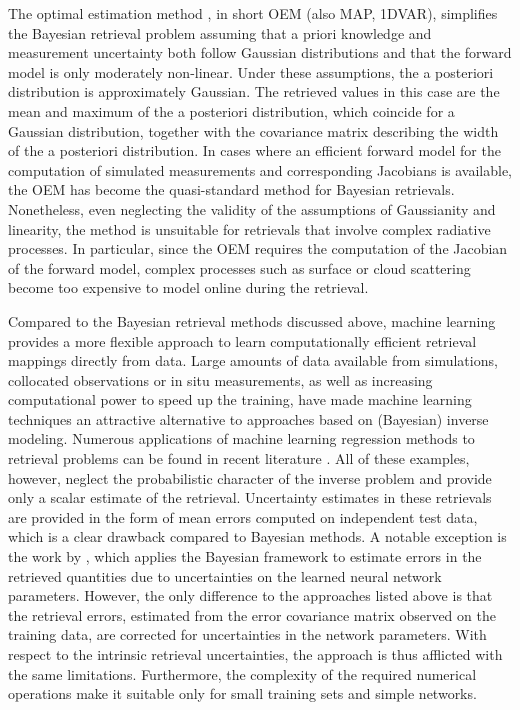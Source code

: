 \documentclass[journal abbreviation, manuscript]{copernicus}
\begin{document}
The optimal estimation method \citep{rodgers}, in short OEM (also MAP, 1DVAR),
simplifies the Bayesian retrieval problem assuming that a priori knowledge and
measurement uncertainty both follow Gaussian distributions and that the forward
model is only moderately non-linear. Under these assumptions, the a posteriori
distribution is approximately Gaussian. The retrieved values in this case are the mean
and maximum of the a posteriori distribution, which coincide for a Gaussian
distribution, together with the covariance matrix describing the width of the a
posteriori distribution. In cases where an efficient forward model for the
computation of simulated measurements and corresponding Jacobians is available,
the OEM has become the quasi-standard method for Bayesian retrievals.
Nonetheless, even neglecting the validity of the assumptions of Gaussianity and
linearity, the method is unsuitable for retrievals that involve complex
radiative processes. In particular, since the OEM requires the computation of the
Jacobian of the forward model, complex processes such as surface or cloud scattering
 become too expensive to model online during the retrieval.

Compared to the Bayesian retrieval methods discussed above, machine learning
provides a more flexible approach to learn computationally efficient retrieval
mappings directly from data. Large amounts of data available from simulations,
collocated observations or in situ measurements, as well as increasing computational
power to speed up the training, have made machine learning techniques
an attractive alternative to approaches based on (Bayesian) inverse modeling.
Numerous applications of machine learning regression methods to retrieval
problems can be found in recent literature \citep{jimenez, holl, strandgren, wang, hakansson, brath}.
All of these examples, however, neglect the probabilistic character of the
inverse problem and provide only a scalar estimate of the retrieval. Uncertainty
estimates in these retrievals are provided in the form of mean errors computed
on independent test data, which is a clear drawback compared to Bayesian
methods. A notable exception is the work by \citet{aires_2},
which applies the Bayesian framework to estimate errors in the retrieved
quantities due to uncertainties on the learned neural network parameters.
However, the only difference to the approaches listed above is that the
retrieval errors, estimated from the error covariance matrix observed on the
training data, are corrected for uncertainties in the network parameters. With
respect to the intrinsic retrieval uncertainties, the approach is thus afflicted
with the same limitations. Furthermore, the complexity of the required numerical
operations make it suitable only for small training sets and simple networks.
\end{document}
